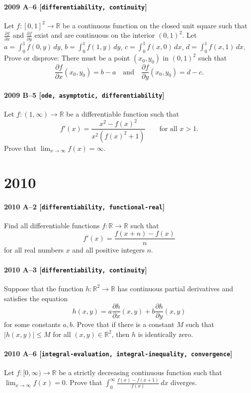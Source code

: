 \documentclass[11pt]{article}
\begin{document}
\paragraph{2009 A--6 \textnormal{[\texttt{differentiability, continuity}]}}
Let $f:[0,1]^2 \to \mathbb{R}$ be a continuous function on the closed unit
square such that $\frac{\partial f}{\partial x}$ and $\frac{\partial f}{\partial y}$ exist
and are continuous on the interior $(0,1)^2$. Let $a = \int_0^1 f(0,y)\,dy$,
$b = \int_0^1 f(1,y)\,dy$, $c = \int_0^1 f(x,0)\,dx$, $d = \int_0^1 f(x,1)\,dx$.
Prove or disprove: There must be a point $(x_0,y_0)$ in $(0,1)^2$ such that
\[
\frac{\partial f}{\partial x} (x_0,y_0) = b - a
\quad \mbox{and} \quad
\frac{\partial f}{\partial y} (x_0,y_0) = d - c.
\]

\paragraph{2009 B--5 \textnormal{[\texttt{ode, asymptotic, differentiability}]}}
Let $f: (1, \infty) \to \mathbb{R}$ be a differentiable function such that
\[
 f'(x) = \frac{x^2 - f(x)^2}{x^2 (f(x)^2 + 1)}
\qquad \mbox{for all $x>1$.}
\]
Prove that $\lim_{x \to \infty} f(x) = \infty$.

\section*{2010}

\paragraph{2010 A--2 \textnormal{[\texttt{differentiability, functional-real}]}}
Find all differentiable functions $f:\mathbb{R} \to \mathbb{R}$ such that
\[
f'(x) = \frac{f(x+n)-f(x)}{n}
\]
for all real numbers $x$ and all positive integers $n$.

\paragraph{2010 A--3 \textnormal{[\texttt{differentiability, continuity}]}}
Suppose that the function $h:\mathbb{R}^2\to \mathbb{R}$ has continuous partial
derivatives and satisfies the equation
\[
h(x,y) = a \frac{\partial h}{\partial x}(x,y) +
b \frac{\partial h}{\partial y}(x,y)
\]
for some constants $a,b$. Prove that if there is a constant $M$ such that
$|h(x,y)|\leq M$ for all $(x,y) \in \mathbb{R}^2$, then $h$ is identically zero.

\paragraph{2010 A--6 \textnormal{[\texttt{integral-evaluation, integral-inequality, convergence}]}}
Let $f:[0,\infty)\to \mathbb{R}$ be a strictly decreasing continuous function
such that $\lim_{x\to\infty} f(x) = 0$. Prove that
$\int_0^\infty \frac{f(x)-f(x+1)}{f(x)}\,dx$ diverges.
\end{document}
